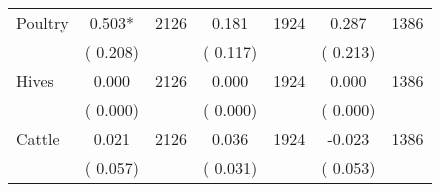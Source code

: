 \begin{tabular}{l*{6}{c}}
Poultry        &              0.503*      &       2126       &              0.181      &       1924       &              0.287      &       1386       \\
                       &       (       0.208)            &                               &       (       0.117)            &                               &       (       0.213)            &                               \\
Hives        &              0.000      &       2126       &              0.000      &       1924       &              0.000      &       1386       \\
                       &       (       0.000)            &                               &       (       0.000)            &                               &       (       0.000)            &                               \\
Cattle        &              0.021      &       2126       &              0.036      &       1924       &             -0.023      &       1386       \\
                       &       (       0.057)            &                               &       (       0.031)            &                               &       (       0.053)            &                               \\
\hline \end{tabular}